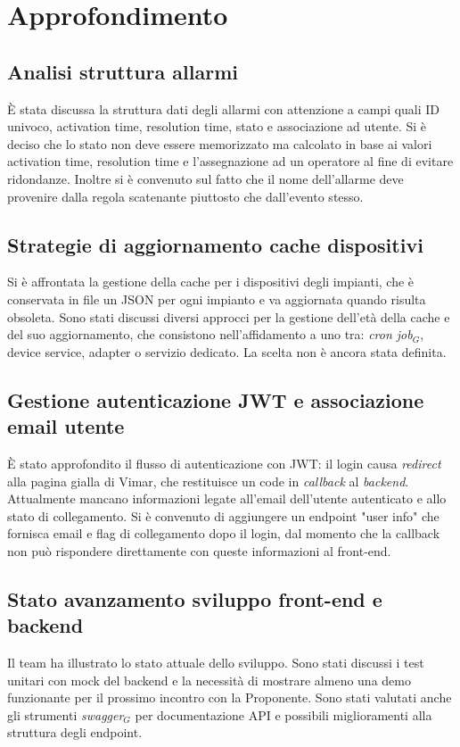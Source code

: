 \documentclass[10pt, letterpaper]{article}
\begin{document}
\section{Approfondimento}

\subsection*{Analisi struttura allarmi}
È stata discussa la struttura dati degli allarmi con attenzione a campi quali ID univoco, activation time, resolution time, stato e associazione ad utente.
Si è deciso che lo stato non deve essere memorizzato ma calcolato in base ai valori activation time, resolution time e l'assegnazione ad un operatore al fine di evitare 
ridondanze. Inoltre si è convenuto sul fatto che il nome dell'allarme deve provenire dalla regola scatenante piuttosto che dall'evento stesso.

\subsection*{Strategie di aggiornamento cache dispositivi}
Si è affrontata la gestione della cache per i dispositivi degli impianti, che è conservata in file un JSON per ogni impianto e va aggiornata quando risulta obsoleta. 
Sono stati discussi diversi approcci per la gestione dell'età della cache e del suo aggiornamento, che consistono nell'affidamento a uno tra: \textit{cron job$_G$}, device service, adapter o servizio dedicato. 
La scelta non è ancora stata definita.

\subsection*{Gestione autenticazione JWT e associazione email utente}
È stato approfondito il flusso di autenticazione con JWT: il login causa \textit{redirect} alla pagina gialla di Vimar, che restituisce un code in \textit{callback} al \textit{backend}.
Attualmente mancano informazioni legate all'email dell'utente autenticato e allo stato di collegamento. Si è convenuto di aggiungere un endpoint "user info" che fornisca email e flag di collegamento dopo il login,
dal momento che la callback non può rispondere direttamente con queste informazioni al front-end.

\subsection*{Stato avanzamento sviluppo front-end e backend}
Il team ha illustrato lo stato attuale dello sviluppo. Sono stati discussi i test unitari con mock del backend e la necessità di mostrare almeno una demo funzionante
per il prossimo incontro con la Proponente. Sono stati valutati anche gli strumenti \textit{swagger$_G$} per documentazione API e possibili miglioramenti alla struttura degli endpoint.
\end{document}
